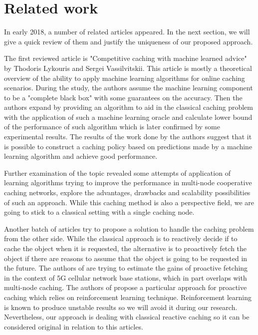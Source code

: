 \section{Related work}

In early 2018, a number of related articles appeared. In the next section, we will give a quick review of them and justify the uniqueness of our proposed approach.

The first reviewed article is "Competitive caching with machine learned advice" by Thodoris Lykouris and Sergei Vassilvitskii\cite{18}. This article is mostly a theoretical overview of the ability to apply machine learning algorithms for online caching scenarios. During the study, the authors assume the machine learning component to be a "complete black box" with some guarantees on the accuracy. Then the authors expand by providing an algorithm to aid in the classical caching problem with the application of such a machine learning oracle and calculate lower bound of the performance of such algorithm which is later confirmed by some experimental results. The results of the work done by the authors suggest that it is possible to construct a caching policy based on predictions made by a machine learning algorithm and achieve good performance.

Further examination of the topic revealed some attempts of application of learning algorithms trying to improve the performance in multi-node cooperative caching networks\cite{19}, explore the advantages, drawbacks and scalability possibilities of such an approach. While this caching method is also a perspective field, we are going to stick to a classical setting with a single caching node.

Another batch of articles\cite{20, 21} try to propose a solution to handle the caching problem from the other side. While the classical approach is to reactively decide if to cache the object when it is requested, the alternative is to proactively fetch the object if there are reasons to assume that the object is going to be requested in the future. The authors of \cite{20} are trying to estimate the gains of proactive fetching in the context of 5G cellular network base stations, which in part overlaps with multi-node caching. The authors of \cite{21} propose a particular approach for proactive caching which relies on reinforcement learning technique. Reinforcement learning is known to produce unstable results so we will avoid it during our research. Nevertheless, our approach is dealing with classical reactive caching so it can be considered original in relation to this articles.


